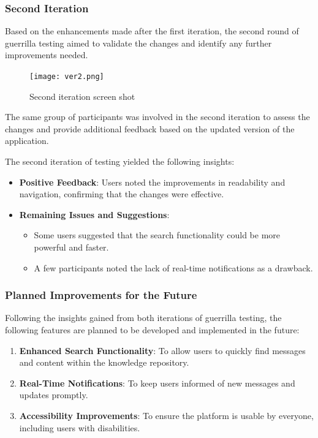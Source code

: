 \documentclass[12pt,a4paper]{article}
\newcounter{subsubsubsection}[subsubsection]
\begin{document}
\subsubsection*{Second Iteration}
Based on the enhancements made after the first iteration, the second round of guerrilla testing aimed to validate the changes and identify any further improvements needed.

\begin{figure}[H]
\centering
\texttt{[image: ver2.png]} 
\caption{Second iteration screen shot}
\label{fig:sitemap}
\end{figure}

The same group of participants was involved in the second iteration to assess the changes and provide additional feedback based on the updated version of the application.

The second iteration of testing yielded the following insights:
\begin{itemize}
    \item \textbf{Positive Feedback}: Users noted the improvements in readability and navigation, confirming that the changes were effective.
    \item \textbf{Remaining Issues and Suggestions}:
    \begin{itemize}
        \item Some users suggested that the search functionality could be more powerful and faster.
        \item A few participants noted the lack of real-time notifications as a drawback.
    \end{itemize}
\end{itemize}

\subsubsection*{Planned Improvements for the Future}
Following the insights gained from both iterations of guerrilla testing, the following features are planned to be developed and implemented in the future:
\begin{enumerate}
    \item \textbf{Enhanced Search Functionality}: To allow users to quickly find messages and content within the knowledge repository.
    \item \textbf{Real-Time Notifications}: To keep users informed of new messages and updates promptly.
    \item \textbf{Accessibility Improvements}: To ensure the platform is usable by everyone, including users with disabilities.
\end{enumerate}
\end{document}
